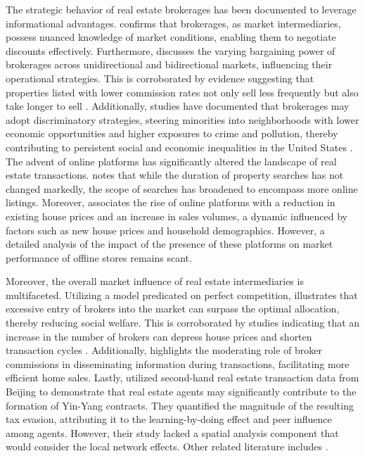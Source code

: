 \documentclass[11pt]{article}
\begin{document}
The strategic behavior of real estate brokerages has been documented to leverage informational advantages. \citet{AGARWAL2019715} confirms that brokerages, as market intermediaries, possess nuanced knowledge of market conditions, enabling them to negotiate discounts effectively. Furthermore, \citet{HAN2015813} discusses the varying bargaining power of brokerages across unidirectional and bidirectional markets, influencing their operational strategies. This is corroborated by evidence suggesting that properties listed with lower commission rates not only sell less frequently but also take longer to sell \citep{10.1257/app.20160214}. Additionally, studies have documented that brokerages may adopt discriminatory strategies, steering minorities into neighborhoods with lower economic opportunities and higher exposures to crime and pollution, thereby contributing to persistent social and economic inequalities in the United States \citep{RePEc:ucp:jpolec:doi:10.1086/720140}. The advent of online platforms has significantly altered the landscape of real estate transactions. \citet{ZUMPANO2003134} notes that while the duration of property searches has not changed markedly, the scope of searches has broadened to encompass more online listings. Moreover, \citet{ZHANG2021101104} associates the rise of online platforms with a reduction in existing house prices and an increase in sales volumes, a dynamic influenced by factors such as new house prices and household demographics. However, a detailed analysis of the impact of the presence of these platforms on market performance of offline stores remains scant.

Moreover, the overall market influence of real estate intermediaries is multifaceted. Utilizing a model predicated on perfect competition, \citet{williams_agency_1998} illustrates that excessive entry of brokers into the market can surpass the optimal allocation, thereby reducing social welfare. This is corroborated by studies indicating that an increase in the number of brokers can depress house prices and shorten transaction cycles \citep{https://doi.org/10.1002/jae.2891}. Additionally, \citet{qu_identifying_2021} highlights the moderating role of broker commissions in disseminating information during transactions, facilitating more efficient home sales. Lastly, \citet{AGARWAL2024103668} utilized second-hand real estate transaction data from Beijing to demonstrate that real estate agents may significantly contribute to the formation of Yin-Yang contracts. They quantified the magnitude of the resulting tax evasion, attributing it to the learning-by-doing effect and peer influence among agents. However, their study lacked a spatial analysis component that would consider the local network effects. Other related literature includes \citep{doi:10.1080/10527001.2021.2016340, d082a2db-5cce-33f2-87c4-9cb020cc6666, doi:10.1080/10835547.1996.12090852}.
\end{document}
